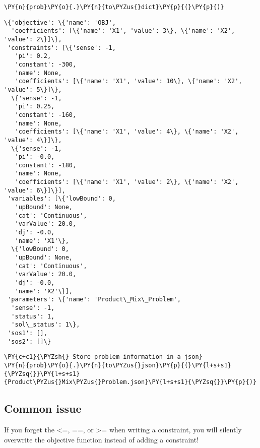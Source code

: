     \begin{tcolorbox}[breakable, size=fbox, boxrule=1pt, pad at break*=1mm,colback=cellbackground, colframe=cellborder]
\begin{Verbatim}[commandchars=\\\{\}]
\PY{n}{prob}\PY{o}{.}\PY{n}{to\PYZus{}dict}\PY{p}{(}\PY{p}{)}
\end{Verbatim}
\end{tcolorbox}

            \begin{tcolorbox}[breakable, size=fbox, boxrule=.5pt, pad at break*=1mm, opacityfill=0]
\begin{Verbatim}[commandchars=\\\{\}]
\{'objective': \{'name': 'OBJ',
  'coefficients': [\{'name': 'X1', 'value': 3\}, \{'name': 'X2', 'value': 2\}]\},
 'constraints': [\{'sense': -1,
   'pi': 0.2,
   'constant': -300,
   'name': None,
   'coefficients': [\{'name': 'X1', 'value': 10\}, \{'name': 'X2', 'value': 5\}]\},
  \{'sense': -1,
   'pi': 0.25,
   'constant': -160,
   'name': None,
   'coefficients': [\{'name': 'X1', 'value': 4\}, \{'name': 'X2', 'value': 4\}]\},
  \{'sense': -1,
   'pi': -0.0,
   'constant': -180,
   'name': None,
   'coefficients': [\{'name': 'X1', 'value': 2\}, \{'name': 'X2', 'value': 6\}]\}],
 'variables': [\{'lowBound': 0,
   'upBound': None,
   'cat': 'Continuous',
   'varValue': 20.0,
   'dj': -0.0,
   'name': 'X1'\},
  \{'lowBound': 0,
   'upBound': None,
   'cat': 'Continuous',
   'varValue': 20.0,
   'dj': -0.0,
   'name': 'X2'\}],
 'parameters': \{'name': 'Product\_Mix\_Problem',
  'sense': -1,
  'status': 1,
  'sol\_status': 1\},
 'sos1': [],
 'sos2': []\}
\end{Verbatim}
\end{tcolorbox}
        
    \begin{tcolorbox}[breakable, size=fbox, boxrule=1pt, pad at break*=1mm,colback=cellbackground, colframe=cellborder]
\begin{Verbatim}[commandchars=\\\{\}]
\PY{c+c1}{\PYZsh{} Store problem information in a json}
\PY{n}{prob}\PY{o}{.}\PY{n}{to\PYZus{}json}\PY{p}{(}\PY{l+s+s1}{\PYZsq{}}\PY{l+s+s1}{Product\PYZus{}Mix\PYZus{}Problem.json}\PY{l+s+s1}{\PYZsq{}}\PY{p}{)}
\end{Verbatim}
\end{tcolorbox}

    \hypertarget{common-issue}{%
\subsection{Common issue}\label{common-issue}}

If you forget the \textless=, ==, or \textgreater= when writing a
constraint, you will silently overwrite the objective function instead
of adding a constraint!



